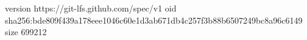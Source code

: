 version https://git-lfs.github.com/spec/v1
oid sha256:bde809f439a178eee1046c60e1d3ab671db4c257f3b88b6507249bc8a96c6149
size 699212
